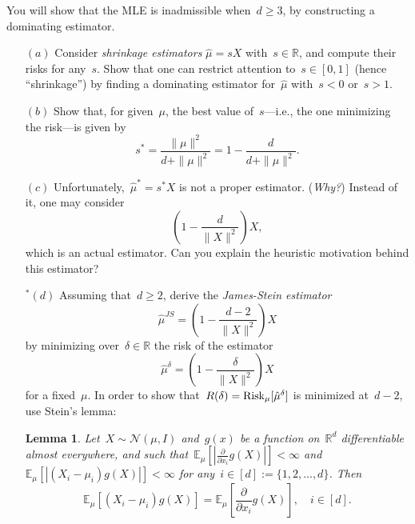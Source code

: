 \documentclass[11pt]{article}
\newtheorem{lemma}{Lemma}%
\newcommand{\R}{\mathds{R}}
\newcommand{\E}{\mathds{E}}
\newcommand{\cN}{\mathcal{N}}
\newcommand{\Risk}{\textup{Risk}}
\newcommand{\geqs}{\geqslant}
\renewcommand{\ge}{\geqs}
\begin{document}
You will show that the MLE is inadmissible when~$d \ge 3$, by constructing a dominating estimator.




\begin{itemize}
\item[$(a)$] 
Consider {\em shrinkage estimators}
$
\hat\mu =  sX
$
with~$s \in \R$, and compute their risks for any~$s$.
Show that one can restrict attention to~$s \in [0,1]$ (hence ``shrinkage'') by finding a dominating estimator for~$\hat\mu$ with~$s < 0$ or~$s > 1$. 


\item[$(b)$] 
Show that, for given~$\mu$, the best value of~$s$---i.e., the one minimizing the risk---is given by
\[
s^* = \frac{\|\mu\|^2}{d + \|\mu\|^2} 
= 1-\frac{d}{d + \|\mu\|^2}.
\]
\item[$(c)$] Unfortunately,~$\hat \mu^* = s^* X$ is not a proper estimator. ({\em Why?}) 
Instead of it, one may consider
\[
\left(1-\frac{d}{\|X\|^2}\right) X,
\]
which is an actual estimator. Can you explain the heuristic motivation behind this estimator?

\item[$^*(d)$]
Assuming that~$d \ge 2$, derive the {\em James-Stein estimator}
\begin{equation}
\hat \mu^{JS} = \left(1-\frac{d-2}{\|X\|^2}\right) X
\end{equation}
by minimizing over~$\delta \in \R$ the risk of the estimator  
\[
\hat \mu^{\delta} = \left(1-\frac{\delta}{\|X\|^2}\right) X
\]
for a fixed~$\mu$. 
In order to show that~$R(\delta) = \Risk_{\mu}[\hat \mu^{\delta}]$ is minimized at~$d-2$, use Stein's lemma: 

\begin{lemma}
Let~$X \sim \cN(\mu, I)$ and~$g(x)$ be a function on~$\R^d$ differentiable almost everywhere, and such that~$\E_{\mu} \left[ | \frac{\partial}{\partial x_i} g(X) | \right] < \infty$ and~$\E_{\mu}[|(X_i - \mu_i)g(X)|] < \infty$ for any~$i \in [d] := \{1, 2, ..., d\}$. Then
\[
\E_{\mu} [(X_i - \mu_i)g(X)] = \E_{\mu} \left[ \frac{\partial}{\partial x_i} g(X) \right], \quad i \in [d].
\]
\end{lemma}


\end{itemize}
\end{document}
